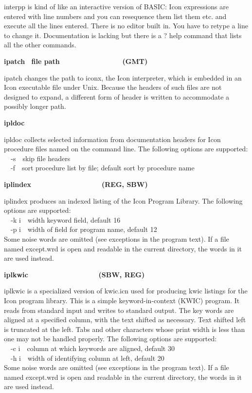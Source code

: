 {\textsf{interpp} is kind of like an interactive version of BASIC: Icon
expressions are entered with line numbers and you can resequence them
list them etc. and execute all the lines entered. There is no editor
built in. You have to retype a line to change it. Documentation is
lacking but there is a {\textquotedbl}?{\textquotedbl} help command
that lists all the other commands. 

{\sffamily\bfseries
ipatch \ \textrm{\textmd{file
path\ \ \ \ \ \ \ \ \ \ \ \ \ \ \ \ }}(GMT)}

\textsf{ipatch} changes the path to iconx, the Icon interpreter, which
is embedded in an Icon executable file under Unix. Because the headers
of such files are not designed to expand, a different form of header is
written to accommodate a possibly longer path.

{\sffamily\bfseries
ipldoc\ \ \ \ \ \ \ \ \ \ \ \ \ \ \ \ \ \ \ \ \ \ }

\textsf{ipldoc} collects selected information from documentation headers
for Icon procedure files named on the command line. The following
options are supported:\\
\texttt{\ \ }\textsf{{}-s}\ \ skip file headers\\
\ \ \textsf{{}-f}\ \ sort procedure list by file; default sort by
procedure name

{\sffamily\bfseries
iplindex\ \ \ \ \ \ \ \ \ \ \ \ \ \ \ \ \ \ (REG, SBW)}

\textsf{iplindex} produces an indexed listing of the Icon Program
Library. The following options are supported:\\
\texttt{\ \ }\textsf{{}-k i}\ \ width keyword field, default 16\\
\ \ \textsf{{}-p i}\ \ width of field for program name, default
12\\
Some noise words are omitted (see
{\textquotedbl}exceptions{\textquotedbl} in the program text). If a
file named except.wrd is open and readable in the current directory,
the words in it are used instead. 

{\sffamily\bfseries
iplkwic\ \ \ \ \ \ \ \ \ \ \ \ \ \ \ \ \ \ (SBW, REG)}

\textsf{iplkwic} is a specialized version of \textsf{kwic.icn} used for
producing kwic listings for the Icon program library. This is a simple
keyword-in-context (KWIC) program. It reads from standard
input and writes to standard output. The
{\textquotedbl}key{\textquotedbl} words are aligned at a specified
column, with the text shifted as necessary. Text shifted left is
truncated at the left. Tabs and other characters whose
{\textquotedbl}print width{\textquotedbl} is less than one may not be
handled properly. The following options are supported:\\
\ \ \textsf{{}-c i}\ \ column at which keywords are aligned, default
30\\
\ \ \textsf{{}-h i}\ \ width of identifying column at left, default
20\\
Some noise words are omitted (see
{\textquotedbl}exceptions{\textquotedbl} in the program text). If a
file named except.wrd is open and readable in the current directory,
the words in it are used instead.

}
